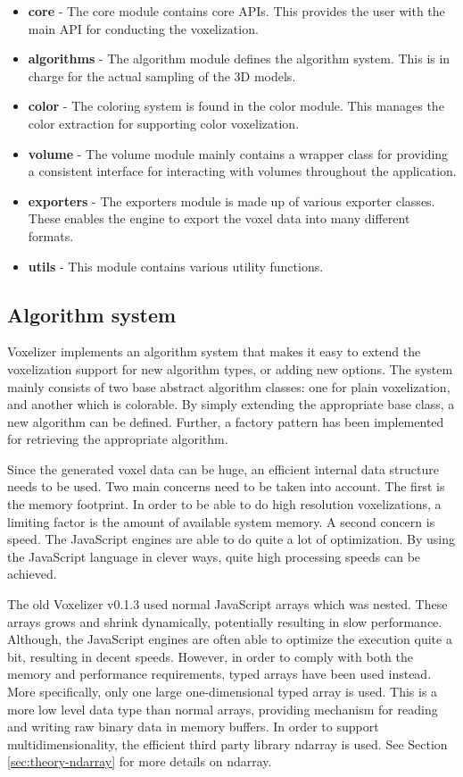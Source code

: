 \begin{itemize}
    \item \textbf{core} - The core module contains core APIs. This provides the user with the main API for conducting the voxelization.
    \item \textbf{algorithms} - The algorithm module defines the algorithm system. This is in charge for the actual sampling of the 3D models.
    \item \textbf{color} - The coloring system is found in the color module. This manages the color extraction for supporting color voxelization.
    \item \textbf{volume} - The volume module mainly contains a wrapper class for providing a consistent interface for interacting with volumes throughout the application.  
    \item \textbf{exporters} - The exporters module is made up of various exporter classes. These enables the engine to export the voxel data into many different formats.
    \item \textbf{utils} - This module contains various utility functions.
\end{itemize}

\subsection{Algorithm system}
\label{sec:method-algorithm-system}
Voxelizer implements an algorithm system that makes it easy to extend the voxelization support for new algorithm types, or adding new options. The system mainly consists of two base abstract algorithm classes: one for plain voxelization, and another which is colorable. By simply extending the appropriate base class, a new algorithm can be defined. Further, a factory pattern has been implemented for retrieving the appropriate algorithm.

Since the generated voxel data can be huge, an efficient internal data structure needs to be used. Two main concerns need to be taken into account. The first is the memory footprint. In order to be able to do high resolution voxelizations, a limiting factor is the amount of available system memory. A second concern is speed. The JavaScript engines are able to do quite a lot of optimization. By using the JavaScript language in clever ways, quite high processing speeds can be achieved.

The old Voxelizer v0.1.3 used normal JavaScript arrays which was nested. These arrays grows and shrink dynamically, potentially resulting in slow performance. Although, the JavaScript engines are often able to optimize the execution quite a bit, resulting in decent speeds. However, in order to comply with both the memory and performance requirements, typed arrays have been used instead. More specifically, only one large one-dimensional typed array is used. This is a more low level data type than normal arrays, providing mechanism for reading and writing raw binary data in memory buffers. In order to support multidimensionality, the efficient third party library ndarray is used. See Section \ref{sec:theory-ndarray} for more details on ndarray.

